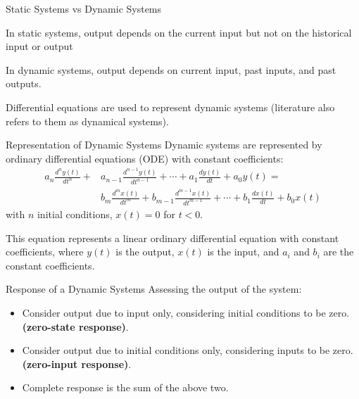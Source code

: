 \documentclass[aspectratio=169,xcolor=dvipsnames,svgnames,x11names,fleqn]{beamer}
\begin{document}
\begin{frame}{Static Systems vs Dynamic Systems}
    \begin{gradbox}{}
        In static systems, output depends on the current input but not on the historical input or output
    \end{gradbox}
\vspace{10pt}
    \begin{gradblock}{}
    In dynamic systems, output depends on current input, past inputs, and past outputs.
    \end{gradblock}
\vspace{10pt}
       \begin{gradbox}{}
       Differential equations are used to represent dynamic systems (literature also refers to them as dynamical systems).
    \end{gradbox}

\end{frame}

\begin{frame}{Representation of Dynamic Systems}
Dynamic systems are represented by ordinary differential equations (ODE) with constant coefficients:
\small
\begin{equation*}
\begin{aligned}
    a_n \frac{d^n y(t)}{dt^n} + & a_{n-1} \frac{d^{n-1} y(t)}{dt^{n-1}} + \cdots + a_1 \frac{dy(t)}{dt} + a_0 y(t) = \\
   &  b_m \frac{d^m x(t)}{dt^m} + b_{m-1} \frac{d^{m-1} x(t)}{dt^{m-1}} + \cdots + b_1 \frac{dx(t)}{dt} + b_0 x(t)
\end{aligned}
\end{equation*}
with $n$ initial conditions, $x(t) = 0$ for $t < 0$.

\bf
\begin{center}
    This equation represents a linear ordinary differential equation with constant coefficients, where $ y(t)$  is the output,  $x(t)$  is the input, and  $a_i$  and  $b_i$  are the constant coefficients. 
\end{center}
\end{frame}

\begin{frame}{Response of a Dynamic Systems}
    Assessing the output of the system:
    \begin{itemize}
        \item Consider output due to input only, considering initial conditions to be zero.  \textbf{(zero-state response)}.
        \item Consider output due to initial conditions only, considering inputs to be zero. \textbf{(zero-input response)}.
        \item Complete response is the sum of the above two.


    \end{itemize}
\end{frame}
\end{document}
